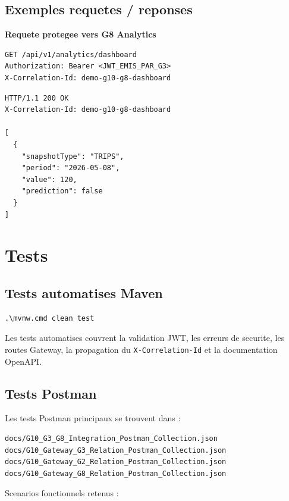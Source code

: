 \documentclass[12pt, a4paper]{article}
\begin{document}
\subsection{Exemples requetes / reponses}

\textbf{Requete protegee vers G8 Analytics}

\begin{lstlisting}[style=codeStyle]
GET /api/v1/analytics/dashboard
Authorization: Bearer <JWT_EMIS_PAR_G3>
X-Correlation-Id: demo-g10-g8-dashboard
\end{lstlisting}

\begin{lstlisting}[style=codeStyle]
HTTP/1.1 200 OK
X-Correlation-Id: demo-g10-g8-dashboard

[
  {
    "snapshotType": "TRIPS",
    "period": "2026-05-08",
    "value": 120,
    "prediction": false
  }
]
\end{lstlisting}

\section{Tests}

\subsection{Tests automatises Maven}

\begin{lstlisting}[style=codeStyle]
.\mvnw.cmd clean test
\end{lstlisting}

Les tests automatises couvrent la validation JWT, les erreurs de securite, les routes Gateway, la propagation du \texttt{X-Correlation-Id} et la documentation OpenAPI.

\subsection{Tests Postman}

Les tests Postman principaux se trouvent dans :

\begin{lstlisting}[style=codeStyle]
docs/G10_G3_G8_Integration_Postman_Collection.json
docs/G10_Gateway_G3_Relation_Postman_Collection.json
docs/G10_Gateway_G2_Relation_Postman_Collection.json
docs/G10_Gateway_G8_Relation_Postman_Collection.json
\end{lstlisting}

Scenarios fonctionnels retenus :
\end{document}
